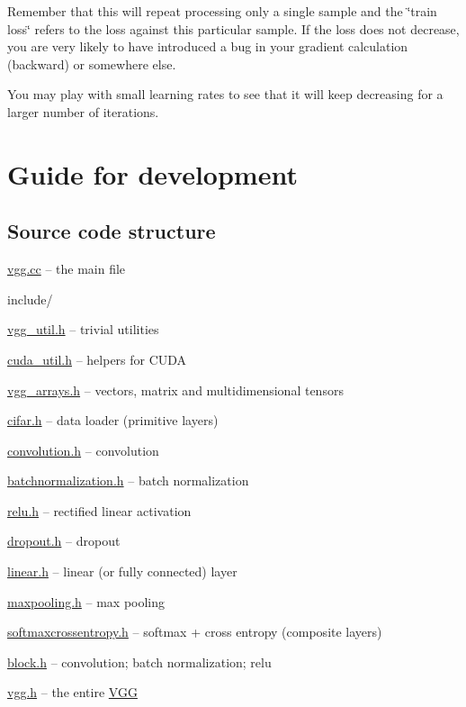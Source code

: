 Remember that this will repeat processing only a single sample and the \char`\"{}train loss\char`\"{} refers to the loss against this particular sample. If the loss does not decrease, you are very likely to have introduced a bug in your gradient calculation (backward) or somewhere else.

You may play with small learning rates to see that it will keep decreasing for a larger number of iterations.




\section*{Guide for development }

\subsection*{Source code structure }


\begin{DoxyItemize}
\item \hyperlink{vgg_8cc}{vgg.\+cc} -- the main file
\item include/
\begin{DoxyItemize}
\item \hyperlink{vgg__util_8h}{vgg\+\_\+util.\+h} -- trivial utilities
\item \hyperlink{cuda__util_8h}{cuda\+\_\+util.\+h} -- helpers for C\+U\+DA
\item \hyperlink{vgg__arrays_8h}{vgg\+\_\+arrays.\+h} -- vectors, matrix and multidimensional tensors
\item \hyperlink{cifar_8h}{cifar.\+h} -- data loader (primitive layers)
\item \hyperlink{convolution_8h}{convolution.\+h} -- convolution
\item \hyperlink{batchnormalization_8h}{batchnormalization.\+h} -- batch normalization
\item \hyperlink{relu_8h}{relu.\+h} -- rectified linear activation
\item \hyperlink{dropout_8h}{dropout.\+h} -- dropout
\item \hyperlink{linear_8h}{linear.\+h} -- linear (or fully connected) layer
\item \hyperlink{maxpooling_8h}{maxpooling.\+h} -- max pooling
\item \hyperlink{softmaxcrossentropy_8h}{softmaxcrossentropy.\+h} -- softmax + cross entropy (composite layers)
\item \hyperlink{block_8h}{block.\+h} -- convolution; batch normalization; relu
\item \hyperlink{vgg_8h}{vgg.\+h} -- the entire \hyperlink{structVGG}{V\+GG}
\end{DoxyItemize}
\end{DoxyItemize}

